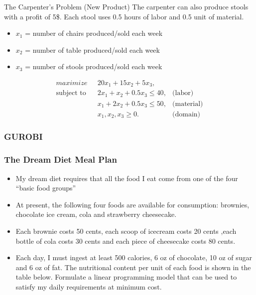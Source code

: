 \documentclass[11pt]{beamer}
\begin{document}
\begin{frame}{The Carpenter's Problem (New Product)}
The carpenter can also produce stools with a profit of 5\$. Each stool uses 0.5 hours of labor and 0.5 unit of material.
\pause
\begin{itemize}
\item $x_1$ = number of chairs produced/sold each week
\item $x_2$ = number of table produced/sold each week
\item $x_3$ = number of stools produced/sold each week
\end{itemize}
\pause  
\begin{align}
\displaystyle maximize \mbox{ } & 20x_1 + 15x_2 + 5 x_3, \label{carpenter2:objective} \\
% 
\mbox{subject to }&2 x_1 + x_2 + 0.5x_3  \leq 40, & \mbox{(labor)}  \label{carpenter2:labor}\\
&x_1 + 2 x_2 +0.5x_3 \leq 50, & \mbox{(material)}  \label{carpenter2:material}\\
& x_1, x_2, x_3 \geq 0. & \mbox{(domain)} \label{carpenter2:domain}
\end{align}
\end{frame}

\begin{frame}
\frametitle{GUROBI}
\end{frame}
\begin{frame}
\frametitle{The Dream Diet Meal Plan}
\begin{itemize}
\item My dream diet requires that all the food I eat come from one of the four “basic food groups”
\item At present, the following four foods are available for consumption: brownies, chocolate ice cream, cola and strawberry cheesecake.
\item Each brownie costs 50 cents, each scoop of icecream costs 20 cents ,each bottle of cola costs 30 cents and each piece of cheesecake costs 80 cents.
\item Each day, I must ingest at least 500 calories, 6 oz of chocolate, 10 oz of sugar and 6 oz of fat. The nutritional content per unit of each food is shown in the table below. Formulate a linear programming model that can be used to satisfy my daily requirements at minimum cost.
\end{itemize}

\end{frame}
\end{document}
